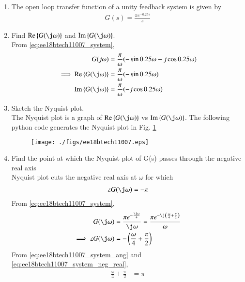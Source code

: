 \begin{enumerate}[label=\thesection.\arabic*.,ref=\thesection.\theenumi]
\item The open loop transfer function of a unity feedback system is given by
\begin{align}
\label{eq:ee18btech11007_system}
 G(s)=\frac{\pi e^{-0.25s}}{s}
\end{align}
\item Find $\text{Re} \cbrak{G(\j \omega)}$ and $\text{Im} \cbrak{G(\j \omega)}$.
\\
\solution From \eqref{eq:ee18btech11007_system},
%
\begin{align}
G(j\omega)&=\frac{\pi}{\omega}(-\sin{0.25\omega}-j\cos{0.25\omega})
\\
\implies  \text{Re} \cbrak{G(\j \omega)}&=\frac{\pi}{\omega}(-\sin{0.25\omega}) 
\\
 \text{Im} \cbrak{G(\j \omega)}&=\frac{\pi}{\omega}(-j\cos{0.25\omega}) 
\end{align}
%
\item Sketch the Nyquist plot.
\\
\solution The Nyquist plot is a graph of $\text{Re} \cbrak{G(\j \omega)}$  vs $\text{Im} \cbrak{G(\j \omega)}$.
The following python code generates the Nyquist plot in Fig.  \ref{fig:ee18btech11007}
%
\begin{figure}[!h]
  \texttt{[image: ./figs/ee18btech11007.eps]}
  \caption{}
  \label{fig:ee18btech11007}
\end{figure}
%
\item Find the point at which the Nyquist plot of G(s) passes through the negative real axis
\\
\solution  Nyquist plot cuts the negative real axis at $\omega $ for which 
\begin{align}
\angle G(\j\omega)=-\pi
\label{eq:ee18btech11007_system_neg_real}
\end{align}
From \eqref{eq:ee18btech11007_system},
\begin{align}
 G(\j\omega)&=\frac{\pi e^{-\frac{\j\omega}{4}}}{\j\omega} = \frac{\pi e^{-\j\brak{\frac{\omega}{4}+\frac{\pi}{2}}}}{\omega}
\\
\implies \angle{ G(\j\omega)} &= -\brak{\frac{\omega}{4}+\frac{\pi}{2}}
\label{eq:ee18btech11007_system_ang}
\end{align}
From \eqref{eq:ee18btech11007_system_ang} and \eqref{eq:ee18btech11007_system_neg_real}, 
\begin{align}
\frac{\omega}{4}+\frac{\pi}{2} &= \pi

\end{align}
\end{enumerate}
